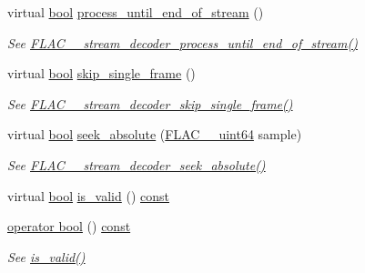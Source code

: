 \begin{DoxyCompactItemize}
virtual \hyperlink{mac_2config_2i386_2lib-src_2libsoxr_2soxr-config_8h_abb452686968e48b67397da5f97445f5b}{bool} \hyperlink{class_f_l_a_c_1_1_decoder_1_1_stream_a019c76ebdf480ab06d8838a0005f3017}{process\+\_\+until\+\_\+end\+\_\+of\+\_\+stream} ()
\begin{DoxyCompactList}\small\item\em See \hyperlink{group__flac__stream__decoder_ga4544352442870ea9f16f388a97d81dff}{F\+L\+A\+C\+\_\+\+\_\+stream\+\_\+decoder\+\_\+process\+\_\+until\+\_\+end\+\_\+of\+\_\+stream()} \end{DoxyCompactList}\item 
virtual \hyperlink{mac_2config_2i386_2lib-src_2libsoxr_2soxr-config_8h_abb452686968e48b67397da5f97445f5b}{bool} \hyperlink{class_f_l_a_c_1_1_decoder_1_1_stream_ad82f2665930b14d9135d443217c699bf}{skip\+\_\+single\+\_\+frame} ()
\begin{DoxyCompactList}\small\item\em See \hyperlink{group__flac__stream__decoder_ga371bc2b4f5571e40c47f4db5a8a745f8}{F\+L\+A\+C\+\_\+\+\_\+stream\+\_\+decoder\+\_\+skip\+\_\+single\+\_\+frame()} \end{DoxyCompactList}\item 
virtual \hyperlink{mac_2config_2i386_2lib-src_2libsoxr_2soxr-config_8h_abb452686968e48b67397da5f97445f5b}{bool} \hyperlink{class_f_l_a_c_1_1_decoder_1_1_stream_a859fee76dfa23c09e0b0f872b4a328aa}{seek\+\_\+absolute} (\hyperlink{ordinals_8h_aa78c8c70a3eb8a58af7436f278acde8e}{F\+L\+A\+C\+\_\+\+\_\+uint64} sample)
\begin{DoxyCompactList}\small\item\em See \hyperlink{group__flac__stream__decoder_ga5c1c70de72e6ed49db6d61a9131d9117}{F\+L\+A\+C\+\_\+\+\_\+stream\+\_\+decoder\+\_\+seek\+\_\+absolute()} \end{DoxyCompactList}\end{DoxyCompactItemize}
{\bf }\par
\begin{DoxyCompactItemize}
\item 
virtual \hyperlink{mac_2config_2i386_2lib-src_2libsoxr_2soxr-config_8h_abb452686968e48b67397da5f97445f5b}{bool} \hyperlink{class_f_l_a_c_1_1_decoder_1_1_stream_a2cf1cecdf1dc129e950034c76bef8b3a}{is\+\_\+valid} () \hyperlink{getopt1_8c_a2c212835823e3c54a8ab6d95c652660e}{const} 
\item 
\hyperlink{class_f_l_a_c_1_1_decoder_1_1_stream_a82e6e8685d0b70e7686baff4377d98cd}{operator bool} () \hyperlink{getopt1_8c_a2c212835823e3c54a8ab6d95c652660e}{const} 
\begin{DoxyCompactList}\small\item\em See \hyperlink{class_f_l_a_c_1_1_decoder_1_1_stream_a2cf1cecdf1dc129e950034c76bef8b3a}{is\+\_\+valid()} \end{DoxyCompactList}\end{DoxyCompactItemize}

